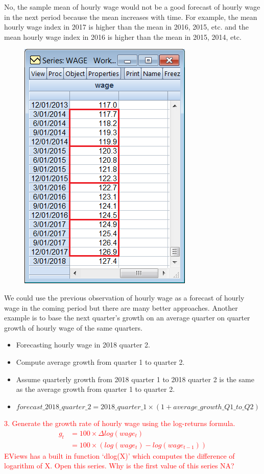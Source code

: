 \documentclass[12pt]{report}
\begin{document}
\noindent No, the sample mean of hourly wage would not be a good forecast of hourly wage in the next period because the mean increases with time. For example, the mean hourly wage index in 2017 is higher than the mean in 2016, 2015, etc. and the mean hourly wage index in 2016 is higher than the mean in 2015, 2014, etc.
\begin{figure}[H]
	\centerline{\includegraphics{2018sem2_q2_5}}
\end{figure}
\vspace{-\baselineskip} \noindent We could use the previous observation of hourly wage as a forecast of hourly wage in the coming period but there are many better approaches. Another example is to base the next quarter's growth on an average quarter on quarter growth of hourly wage of the same quarters.
\begin{itemize}
	\item Forecasting hourly wage in 2018 quarter 2.
	\item Compute average growth from quarter 1 to quarter 2.
	\item Assume quarterly growth from 2018 quarter 1 to 2018 quarter 2 is the same as the average growth from quarter 1 to quarter 2.
	\item $forecast\_2018\_quarter\_2 = 2018\_quarter\_1 \times (1 + average\_growth\_Q1\_to\_Q2)$
\end{itemize}

\noindent \textcolor{red}{3. Generate the growth rate of hourly wage using the log-returns formula. 
\begin{align*}
	g_t &= 100 \times \Delta log(wage_t) \\
	&= 100 \times (log(wage_t) - log(wage_{t-1}))
\end{align*}
EViews has a built in function `dlog(X)' which computes the difference of logarithm of X. Open this series. Why is the first value of this series NA?}
\end{document}
